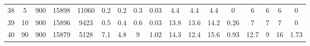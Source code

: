 \documentclass[11pt]{article}
\begin{document}
\begin{landscape}
\begin{longtable}[c]{ccccc|cccc|cccc|cccc}
		\rowcolor[HTML]{EFEFEF} 
		38 & 5 & 900 & 15898 & 11060 & 0.2 & 0.2 & 0.3 & 0.03 & 4.4 & 4.4 & 4.4 & 0 & 6 & 6 & 6 & 0 \\
		\rowcolor[HTML]{EFEFEF} 
		39 & 10 & 900 & 15896 & 9423 & 0.5 & 0.4 & 0.6 & 0.03 & 13.8 & 13.6 & 14.2 & 0.26 & 7 & 7 & 7 & 0 \\
		\rowcolor[HTML]{EFEFEF} 
		40 & 90 & 900 & 15879 & 5128 & 7.1 & 4.8 & 9 & 1.02 & 14.3 & 12.4 & 15.6 & 0.93 & 12.7 & 9 & 16 & 1.73
	\end{longtable}
\end{landscape}	

\end{document}
